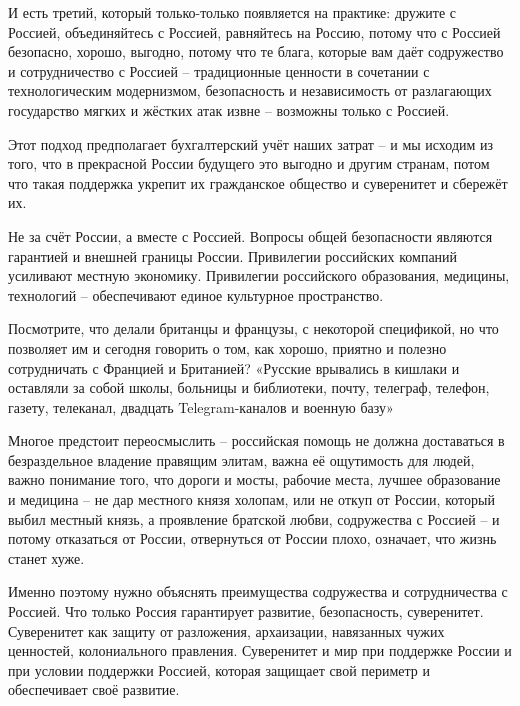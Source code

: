 И есть третий, который только-только появляется на практике: дружите с Россией,
объединяйтесь с Россией, равняйтесь на Россию, потому что с Россией безопасно,
хорошо, выгодно, потому что те блага, которые вам даёт содружество и
сотрудничество с Россией – традиционные ценности в сочетании с технологическим
модернизмом, безопасность и независимость от разлагающих государство мягких и
жёстких атак извне – возможны только с Россией. 

Этот подход предполагает
бухгалтерский учёт наших затрат – и мы исходим из того, что в прекрасной России
будущего это выгодно и другим странам, потом что такая поддержка укрепит их
гражданское общество и суверенитет и сбережёт их. 

Не за счёт России, а вместе с
Россией. Вопросы общей безопасности являются гарантией и внешней границы
России. Привилегии российских компаний усиливают местную экономику. Привилегии
российского образования, медицины, технологий – обеспечивают единое культурное
пространство. 

Посмотрите, что делали британцы и французы, с некоторой спецификой, но что
позволяет им и сегодня говорить о том, как хорошо, приятно и полезно
сотрудничать с Францией и Британией? «Русские врывались в кишлаки и оставляли
за собой школы, больницы и библиотеки, почту, телеграф, телефон, газету,
телеканал, двадцать Telegram-каналов и военную базу» 

Многое предстоит переосмыслить – российская помощь не должна доставаться в
безраздельное владение правящим элитам, важна её ощутимость для людей, важно
понимание того, что дороги и мосты, рабочие места, лучшее образование и
медицина – не дар местного князя холопам, или не откуп от России, который выбил
местный князь, а проявление братской любви, содружества с Россией – и потому
отказаться от России, отвернуться от России плохо, означает, что жизнь станет
хуже.

Именно поэтому нужно объяснять преимущества содружества и сотрудничества с
Россией. Что только Россия гарантирует развитие, безопасность, суверенитет.
Суверенитет как защиту от разложения, архаизации, навязанных чужих ценностей,
колониального правления. Суверенитет и мир при поддержке России и при условии
поддержки Россией, которая защищает свой периметр и обеспечивает своё развитие.
